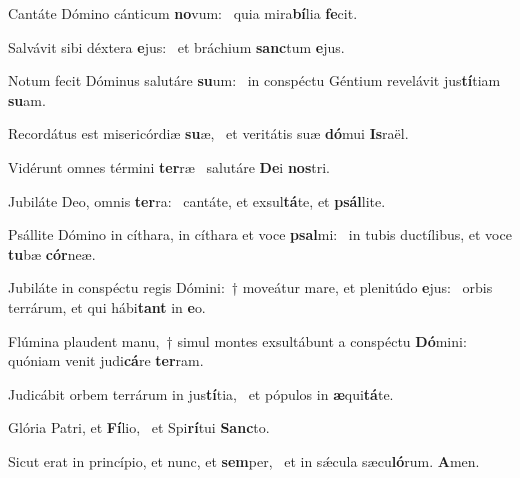 \item Cantáte Dómino cánticum \textbf{no}vum:~\psstar{} quia mira\textbf{bí}lia \textbf{fe}cit.

\item Salvávit sibi déxtera \textbf{e}jus:~\psstar{} et bráchium \textbf{sanc}tum \textbf{e}jus.

\item Notum fecit Dóminus salutáre \textbf{su}um:~\psstar{} in conspéctu Géntium revelávit jus\textbf{tí}tiam \textbf{su}am.

\item Recordátus est misericórdiæ \textbf{su}æ,~\psstar{} et veritátis suæ \textbf{dó}mui \textbf{Is}raël.

\item Vidérunt omnes términi \textbf{ter}ræ~\psstar{} salutáre \textbf{De}i \textbf{nos}tri.

\item Jubiláte Deo, omnis \textbf{ter}ra:~\psstar{} cantáte, et exsul\textbf{tá}te, et \textbf{psál}lite.

\item Psállite Dómino in cíthara, in cíthara et voce \textbf{psal}mi:~\psstar{} in tubis ductílibus, et voce \textbf{tu}bæ \textbf{cór}neæ.

\item Jubiláte in conspéctu regis Dómini:~† moveátur mare, et plenitúdo \textbf{e}jus:~\psstar{} orbis terrárum, et qui hábi\textbf{tant} in \textbf{e}o.

\item Flúmina plaudent manu,~† simul montes exsultábunt a conspéctu \textbf{Dó}mini:~\psstar{} quóniam venit judi\textbf{cá}re \textbf{ter}ram.

\item Judicábit orbem terrárum in jus\textbf{tí}tia,~\psstar{} et pópulos in \textbf{æ}qui\textbf{tá}te.

\item Glória Patri, et \textbf{Fí}lio,~\psstar{} et Spi\textbf{rí}tui \textbf{Sanc}to.

\item Sicut erat in princípio, et nunc, et \textbf{sem}per,~\psstar{} et in sǽcula sæcu\textbf{ló}rum. \textbf{A}men.
